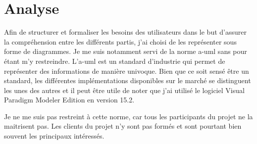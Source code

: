 \chapter{Analyse}
\label{ch:analysis}

Afin de structurer et formaliser les besoins des utilisateurs dans le but d'assurer la compréhension entre les différents partis, j'ai choisi de les représenter sous forme de diagrammes.
Je me suis notamment servi de la norme \gls{a-uml} sans pour étant m'y restreindre.
L'\gls{a-uml} est un standard d'industrie qui permet de représenter des informations de manière univoque.
Bien que ce soit sensé être un standard, les différentes implémentations disponibles sur le marché se distinguent les unes des autres et il peut être utile de noter que j'ai utilisé le logiciel \guillemotleft{} Visual Paradigm Modeler Edition \guillemotright{} en version 15.2.

Je ne me suis pas restreint à cette norme, car tous les participants du projet ne la maitrisent pas.
Les clients du projet n'y sont pas formés et sont pourtant bien souvent les principaux intéressés.





